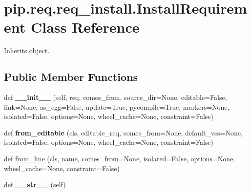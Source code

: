 \hypertarget{classpip_1_1req_1_1req__install_1_1_install_requirement}{}\section{pip.\+req.\+req\+\_\+install.\+Install\+Requirement Class Reference}
\label{classpip_1_1req_1_1req__install_1_1_install_requirement}


Inherits object.

\subsection*{Public Member Functions}
\begin{DoxyCompactItemize}
\item 
\mbox{\label{classpip_1_1req_1_1req__install_1_1_install_requirement_ac4881de641d8c420f2f0723f93bcec17}} 
def {\bfseries \+\_\+\+\_\+init\+\_\+\+\_\+} (self, req, comes\+\_\+from, source\+\_\+dir=None, editable=False, link=None, as\+\_\+egg=False, update=True, pycompile=True, markers=None, isolated=False, options=None, wheel\+\_\+cache=None, constraint=False)
\item 
\mbox{\label{classpip_1_1req_1_1req__install_1_1_install_requirement_a95ee4296192a9f417638062db2197495}} 
def {\bfseries from\+\_\+editable} (cls, editable\+\_\+req, comes\+\_\+from=None, default\+\_\+vcs=None, isolated=False, options=None, wheel\+\_\+cache=None, constraint=False)
\item 
def \hyperlink{classpip_1_1req_1_1req__install_1_1_install_requirement_a5ad0a53aaefb11efa58236e5466654cb}{from\+\_\+line} (cls, name, comes\+\_\+from=None, isolated=False, options=None, wheel\+\_\+cache=None, constraint=False)
\item 
\mbox{\label{classpip_1_1req_1_1req__install_1_1_install_requirement_a9d0c01c8b742a5b37aab8ba2eaf3d582}} 
def {\bfseries \+\_\+\+\_\+str\+\_\+\+\_\+} (self)
\item 
\mbox{\label{classpip_1_1req_1_1req__install_1_1_install_requirement_ad6b5859cb2c7f867db170df80eec54c1}} 

\end{DoxyCompactItemize}
